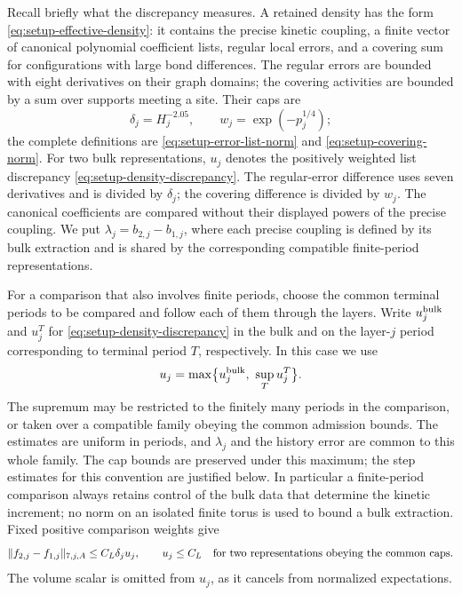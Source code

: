 Recall briefly what the discrepancy measures.  A retained density has
the form \eqref{eq:setup-effective-density}: it contains the precise
kinetic coupling, a finite vector of canonical polynomial coefficient
lists, regular local errors, and a covering sum for configurations with
large bond differences.  The regular errors are bounded with eight
derivatives on their graph domains; the covering activities are bounded
by a sum over supports meeting a site.  Their caps are
\[
 \delta_j=H_j^{-2.05},\qquad w_j=\exp(-p_j^{1/4});
\]
the complete definitions are
\eqref{eq:setup-error-list-norm} and
\eqref{eq:setup-covering-norm}.  For two bulk representations, $u_j$ denotes
the positively weighted list discrepancy
\eqref{eq:setup-density-discrepancy}.  The regular-error difference
uses seven derivatives and is divided by $\delta_j$; the covering
difference is divided by $w_j$.  The canonical coefficients are
compared without their displayed powers of the precise coupling.
We put $\lambda_j=b_{2,j}-b_{1,j}$, where each precise coupling is
defined by its bulk extraction and is shared by the corresponding
compatible finite-period representations.

For a comparison that also involves finite periods, choose the common
terminal periods to be compared and follow each of them through the
layers.  Write $u_j^{\rm bulk}$ and $u_j^T$ for
\eqref{eq:setup-density-discrepancy} in the bulk and on the layer-$j$
period corresponding to terminal period $T$, respectively.  In this case we use
\begin{equation}
 u_j=\max\bigl\{u_j^{\rm bulk},\ \sup_Tu_j^T\bigr\}.
 \label{eq:offset-family-discrepancy}
\end{equation}
The supremum may be restricted to the finitely many periods in the
comparison, or taken over a compatible family obeying the common
admission bounds.  The estimates are uniform in periods, and
$\lambda_j$ and the history error are common to this whole family.
The cap bounds are preserved under this maximum; the step estimates
for this convention are justified below.  In particular a finite-period comparison always
retains control of the bulk data that determine the kinetic increment;
no norm on an isolated finite torus is used to bound a bulk extraction.
Fixed positive comparison weights give
\begin{equation}
 \|f_{2,j}-f_{1,j}\|_{7,j,A}\le C_L\delta_j u_j,
 \qquad u_j\le C_L
 \quad\hbox{for two representations obeying the common caps.}
 \label{eq:offset-discrepancy-caps}
\end{equation}
The volume scalar is omitted from $u_j$, as it cancels from normalized
expectations.

